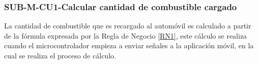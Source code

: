 \subsubsection{SUB-M-CU1-Calcular cantidad de combustible cargado}\label{SUB-M-CU1}
La cantidad de combustible que es recargado al automóvil es calculado a partir de la fórmula expresada por la Regla de Negocio \ref{RN1}, este cálculo se realiza cuando el microcontrolador empieza a enviar señales a la aplicación móvil, en la cual se realiza el proceso de cálculo.
